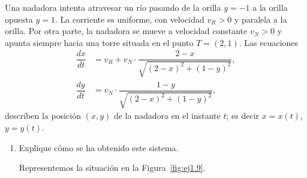 \begin{ejercicio} \label{ej:1.9}
    Una nadadora intenta atravesar un río pasando de la orilla \(y = -1\) a la orilla opuesta \(y = 1\).
    La corriente es uniforme, con velocidad \(v_R > 0\) y paralela a la orilla.
    Por otra parte, la nadadora se mueve a velocidad constante \(v_N > 0\) y apunta siempre hacia una torre situada en el punto \(T = (2, 1)\).
    Las ecuaciones
    \begin{align*}
        \dfrac{dx}{dt} &= v_R + v_N \cdot \dfrac{2 - x}{\sqrt{(2 - x)^2 + (1 - y)^2}},\\
        \dfrac{dy}{dt} &= v_N \cdot \dfrac{1 - y}{\sqrt{(2 - x)^2 + (1 - y)^2}},
    \end{align*}
    describen la posición \((x, y)\) de la nadadora en el instante \(t\); es decir \(x = x(t)\), \(y = y(t)\).
    \begin{enumerate}
        \item Explique cómo se ha obtenido este sistema.
        
        Representemos la situación en la Figura~\ref{fig:ej1.9}.
        \begin{figure}[H]
            \centering
\end{figure}
\end{enumerate}
\end{ejercicio}
